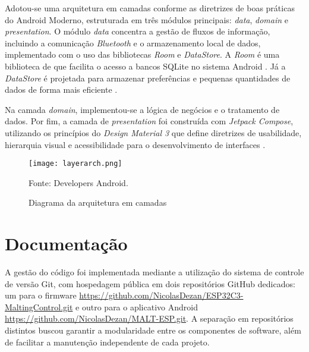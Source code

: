 Adotou-se uma arquitetura em camadas conforme as diretrizes de boas práticas do Android Moderno, estruturada em três módulos principais: \textit{data}, \textit{domain} e \textit{presentation}. O módulo \textit{data} concentra a gestão de fluxos de informação, incluindo a comunicação \textit{Bluetooth} e o armazenamento local de dados, implementado com o uso das bibliotecas \textit{Room} e \textit{DataStore}. A \textit{Room} é uma biblioteca de que facilita o acesso a bancos SQLite no sistema Android \cite{android_room}. Já a \textit{DataStore} é projetada para armazenar preferências e pequenas quantidades de dados de forma mais eficiente \cite{android_datastore}.

Na camada \textit{domain}, implementou-se a lógica de negócios e o tratamento de dados. Por fim, a camada de \textit{presentation} foi construída com \textit{Jetpack Compose}, utilizando os princípios do \textit{Design Material 3} que define diretrizes de usabilidade, hierarquia visual e acessibilidade para o desenvolvimento de interfaces \cite{material3}.

\begin{figure}[ht]
    \centering
    \caption{Diagrama da arquitetura em camadas}
    \label{fig:layerarch}
    \texttt{[image: layerarch.png]}

    {\centering\footnotesize Fonte: Developers Android.\par}
\end{figure}

\section{Documentação}
A gestão do código foi implementada mediante a utilização do sistema de controle de versão Git, com hospedagem pública em dois repositórios GitHub dedicados: um para o firmware \url{https://github.com/NicolasDezan/ESP32C3-MaltingControl.git} e outro para o aplicativo Android \url{https://github.com/NicolasDezan/MALT-ESP.git}. A separação em repositórios distintos buscou garantir a modularidade entre os componentes de software, além de facilitar a manutenção independente de cada projeto.

